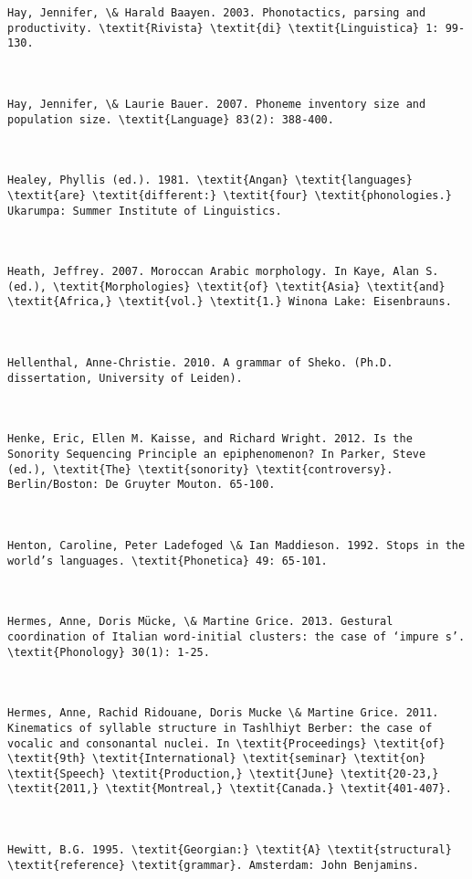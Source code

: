 \begin{verbatim}
Hay, Jennifer, \& Harald Baayen. 2003. Phonotactics, parsing and productivity. \textit{Rivista} \textit{di} \textit{Linguistica} 1: 99-130.



Hay, Jennifer, \& Laurie Bauer. 2007. Phoneme inventory size and population size. \textit{Language} 83(2): 388-400.



Healey, Phyllis (ed.). 1981. \textit{Angan} \textit{languages} \textit{are} \textit{different:} \textit{four} \textit{phonologies.} Ukarumpa: Summer Institute of Linguistics.



Heath, Jeffrey. 2007. Moroccan Arabic morphology. In Kaye, Alan S. (ed.), \textit{Morphologies} \textit{of} \textit{Asia} \textit{and} \textit{Africa,} \textit{vol.} \textit{1.} Winona Lake: Eisenbrauns.



Hellenthal, Anne-Christie. 2010. A grammar of Sheko. (Ph.D. dissertation, University of Leiden).



Henke, Eric, Ellen M. Kaisse, and Richard Wright. 2012. Is the Sonority Sequencing Principle an epiphenomenon? In Parker, Steve (ed.), \textit{The} \textit{sonority} \textit{controversy}. Berlin/Boston: De Gruyter Mouton. 65-100.



Henton, Caroline, Peter Ladefoged \& Ian Maddieson. 1992. Stops in the world’s languages. \textit{Phonetica} 49: 65-101.



Hermes, Anne, Doris Mücke, \& Martine Grice. 2013. Gestural coordination of Italian word-initial clusters: the case of ‘impure s’. \textit{Phonology} 30(1): 1-25.



Hermes, Anne, Rachid Ridouane, Doris Mucke \& Martine Grice. 2011. Kinematics of syllable structure in Tashlhiyt Berber: the case of vocalic and consonantal nuclei. In \textit{Proceedings} \textit{of} \textit{9th} \textit{International} \textit{seminar} \textit{on} \textit{Speech} \textit{Production,} \textit{June} \textit{20-23,} \textit{2011,} \textit{Montreal,} \textit{Canada.} \textit{401-407}.



Hewitt, B.G. 1995. \textit{Georgian:} \textit{A} \textit{structural} \textit{reference} \textit{grammar}. Amsterdam: John Benjamins.




\end{verbatim}
